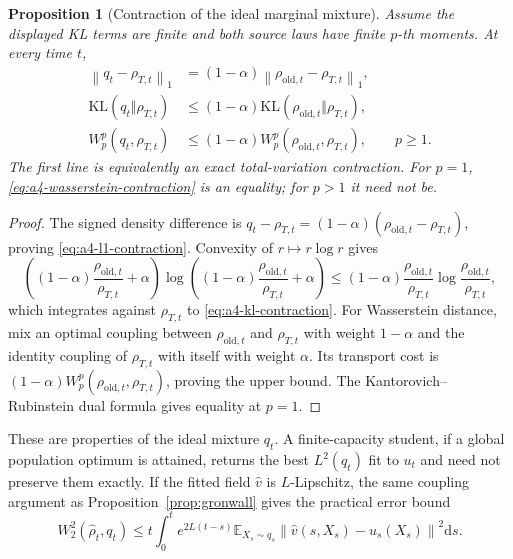 \documentclass[11pt,a4paper]{article}
\newcommand{\E}{\mathbb{E}}
\newcommand{\KL}{\mathrm{KL}}
\newcommand{\norm}[1]{\left\lVert #1 \right\rVert}
\newcommand{\dd}{\mathrm{d}}
\theoremstyle{plain}
\newtheorem{proposition}[theorem]{Proposition}
\theoremstyle{definition}
\begin{document}
\begin{proposition}[Contraction of the ideal marginal mixture]
\label{prop:a4-contraction}
Assume the displayed KL terms are finite and both source laws have finite $p$-th moments.  At
every time $t$,
\begin{align}
\norm{q_t-\rho_{T,t}}_1
&=(1-\alpha)
  \norm{\rho_{\mathrm{old},t}-\rho_{T,t}}_1,
\label{eq:a4-l1-contraction}\\
\KL(q_t\Vert\rho_{T,t})
&\le
(1-\alpha)
\KL(\rho_{\mathrm{old},t}\Vert\rho_{T,t}),
\label{eq:a4-kl-contraction}\\
W_p^p(q_t,\rho_{T,t})
&\le
(1-\alpha)
W_p^p(\rho_{\mathrm{old},t},\rho_{T,t}),
\qquad p\ge1.
\label{eq:a4-wasserstein-contraction}
\end{align}
The first line is equivalently an exact total-variation contraction.  For $p=1$,
\eqref{eq:a4-wasserstein-contraction} is an equality; for $p>1$ it need not be.
\end{proposition}

\begin{proof}
The signed density difference is
$q_t-\rho_{T,t}=(1-\alpha)(\rho_{\mathrm{old},t}-\rho_{T,t})$, proving
\eqref{eq:a4-l1-contraction}.  Convexity of $r\mapsto r\log r$ gives
\[
\left(
  (1-\alpha)\frac{\rho_{\mathrm{old},t}}{\rho_{T,t}}+\alpha
\right)
\log\!\left(
  (1-\alpha)\frac{\rho_{\mathrm{old},t}}{\rho_{T,t}}+\alpha
\right)
\le
(1-\alpha)
\frac{\rho_{\mathrm{old},t}}{\rho_{T,t}}
\log\frac{\rho_{\mathrm{old},t}}{\rho_{T,t}},
\]
which integrates against $\rho_{T,t}$ to \eqref{eq:a4-kl-contraction}.  For Wasserstein distance,
mix an optimal
coupling between $\rho_{\mathrm{old},t}$ and $\rho_{T,t}$ with weight $1-\alpha$ and the identity
coupling of $\rho_{T,t}$ with itself with weight $\alpha$.  Its transport cost is
$(1-\alpha)W_p^p(\rho_{\mathrm{old},t},\rho_{T,t})$, proving the upper bound.  The
Kantorovich--Rubinstein dual formula gives equality at $p=1$.
\end{proof}

These are properties of the ideal mixture $q_t$.  A finite-capacity student, if a global
population optimum is attained, returns the best $L^2(q_t)$ fit to $u_t$ and need not preserve
them exactly.  If the fitted field $\widehat v$ is $L$-Lipschitz, the same coupling argument as
Proposition~\ref{prop:gronwall} gives the practical error bound
\begin{equation}
W_2^2(\widehat\rho_t,q_t)
\le
t\int_0^t
e^{2L(t-s)}
\E_{X_s\sim q_s}
\norm{\widehat v(s,X_s)-u_s(X_s)}^2\dd s .
\label{eq:a4-capacity-bound}
\end{equation}
\end{document}
